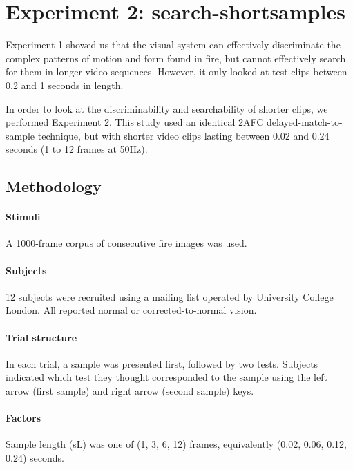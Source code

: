 \section{Experiment 2: \textbf{search-shortsamples}}


Experiment 1 showed us that the visual system can effectively discriminate the complex patterns of motion and form found in fire, but cannot effectively search for them in longer video sequences. However, it only looked at test clips between 0.2 and 1 seconds in length.

In order to look at the discriminability and searchability of shorter clips, we performed Experiment 2. This study used an identical 2AFC delayed-match-to-sample technique, but with shorter video clips lasting between 0.02 and 0.24 seconds (1 to 12 frames at 50Hz).

\subsection{Methodology}


\paragraph{Stimuli}

A 1000-frame corpus of consecutive fire images was used.

\paragraph{Subjects}

12 subjects were recruited using a mailing list operated by University College London. All reported normal or corrected-to-normal vision.

\paragraph{Trial structure}

In each trial, a sample was presented first, followed by two tests. Subjects indicated which test they thought corresponded to the sample using the left arrow (first sample) and right arrow (second sample) keys. 

\paragraph{Factors}

Sample length (sL) was one of (1, 3, 6, 12) frames, 
equivalently (0.02, 0.06, 0.12, 0.24) seconds.


